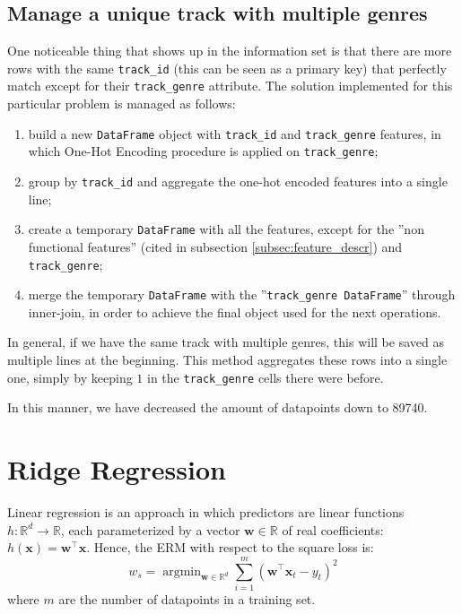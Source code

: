 \documentclass{article}
\DeclareMathOperator*{\argmin}{argmin}
\begin{document}
\subsection{Manage a unique track with multiple genres}
\label{subsec:track_genre}
One noticeable thing that shows up in the information set is that there are more rows with the same \texttt{track\_id} (this can be seen as a primary key) that perfectly match except for their \texttt{track\_genre} attribute. 
The solution implemented for this particular problem is managed as follows:
\begin{enumerate}
	\item build a new \texttt{DataFrame} object with \texttt{track\_id} and \texttt{track\_genre} features, in which One-Hot Encoding procedure is applied on \texttt{track\_genre}; 
	\item group by \texttt{track\_id} and aggregate the one-hot encoded features into a single line;
	\item create a temporary \texttt{DataFrame} with all the features, except for the ''non functional features'' (cited in subsection \ref{subsec:feature_descr}) and \texttt{track\_genre};
	\item merge the temporary \texttt{DataFrame} with the ''\texttt{track\_genre DataFrame}'' through inner-join, in order to achieve the final object used for the next operations.

\end{enumerate}
In general, if we have the same track with multiple genres, this will be saved as multiple lines at the beginning. This method aggregates these rows into a single one, simply by keeping $1$ in the \texttt{track\_genre} cells there were before. 
    
In this manner, we have decreased the amount of datapoints down to 89740.
    

\section{Ridge Regression}
Linear regression is an approach in which predictors are linear functions $h: \mathbb{R}^d \rightarrow \mathbb{R}$, each parameterized by a vector $\boldsymbol{w} \in \mathbb{R}$ of real coefficients: $h(\boldsymbol{x}) = \boldsymbol{w}^\top\boldsymbol{x}$. Hence, the ERM with respect to the square loss is: \begin{equation}
w_s = \argmin_{\boldsymbol{w} \in \mathbb{R}^d}\sum_{i = 1}^m(\boldsymbol{w}^\top \boldsymbol{x}_t - y_t)^2
\end{equation}
where $m$ are the number of datapoints in a training set.
    
\end{document}
